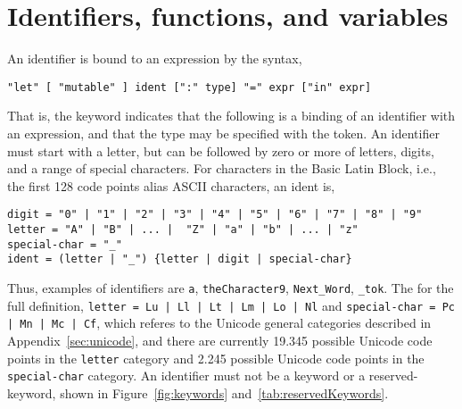 \chapter{Identifiers, functions, and variables}
\label{chap:let}
An identifier is bound to an expression by the syntax,
%
\begin{lstlisting}[language=EBNF]
"let" [ "mutable" ] ident [":" type] "=" expr ["in" expr]
\end{lstlisting}
\begin{comment}
or alternatively
%
\begin{lstlisting}[language=EBNF]
"let" ["mutable"] ident [":" type] "=" expr ["in" newline indent exp]
\end{lstlisting}
\end{comment}
That is, the  keyword indicates that the following is a binding of an identifier with an expression, and that the type may be specified with the \idx{\token{:}} token. An identifier must start with a letter, but can be followed by zero or more of letters, digits, and a range of special characters. For characters in the Basic Latin Block, i.e., the first 128 code points alias ASCII characters, an ident is,
%
\begin{lstlisting}[language=EBNF]
digit = "0" | "1" | "2" | "3" | "4" | "5" | "6" | "7" | "8" | "9"
letter = "A" | "B" | ... |  "Z" | "a" | "b" | ... | "z"
special-char = "_"
ident = (letter | "_") {letter | digit | special-char}
\end{lstlisting}
%
Thus, examples of identifiers are \lstinline{a}, \lstinline{theCharacter9}, \lstinline{Next_Word}, \lstinline{_tok}. The for the full definition, \lstinline[language=EBNF]{letter = Lu | Ll | Lt | Lm | Lo | Nl} and \lstinline[language=EBNF]{special-char = Pc | Mn | Mc | Cf}, which referes to the Unicode general categories described in Appendix~\ref{sec:unicode}, and there are currently 19.345 possible Unicode code points in the \lstinline[language=EBNF]{letter} category and 2.245 possible Unicode code points in the \lstinline[language=EBNF]{special-char} category. An identifier must not be a keyword or a reserved-keyword, shown in Figure~\ref{fig:keywords} and~\ref{tab:reservedKeywords}.
